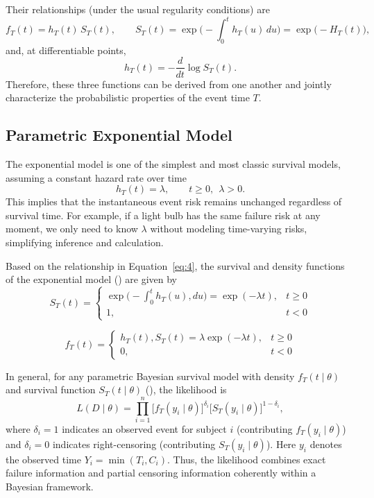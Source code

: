 Their relationships (under the usual regularity conditions) are
\begin{equation}
    f_T(t)=h_T(t)\,S_T(t),\qquad
S_T(t)=\exp\!\Big(-\!\int_0^{t} h_T(u)\,du\Big)=\exp\!\big(-H_T(t)\big),
\label{eq:4}
\end{equation}
and, at differentiable points,
\begin{equation}
    h_T(t)=-\frac{d}{dt}\log S_T(t).
\end{equation}
Therefore, these three functions can be derived from one another and jointly characterize the probabilistic properties of the event time $T$.





\subsection{Parametric Exponential Model} \label{Exponential Model}
The exponential model is one of the simplest and most classic survival models, assuming a constant hazard rate over time
\begin{equation}
h_T(t)=\lambda,\qquad t\ge 0,\ \ \lambda>0 .
\end{equation}
This implies that the instantaneous event risk remains unchanged regardless of survival time. For example, if a light bulb has the same failure risk at any moment, we only need to know $\lambda$ without modeling time-varying risks, simplifying inference and calculation.

Based on the relationship in Equation~\eqref{eq:4}, the survival and density functions of the exponential model (\cite{ibrahim2013bayesian}) are given by
\begin{equation}
S_T(t) =
\begin{cases}
\exp\Big( -\displaystyle\int_0^t h_T(u), du \Big)=\exp(-\lambda t), & t \ge 0 \\
1, & t < 0
\end{cases}
\end{equation}

\begin{equation}
f_T(t) =
\begin{cases}
h_T(t), S_T(t)=\lambda \exp(-\lambda t), & t \ge 0 \\
0, & t < 0
\end{cases}
\end{equation}

In general, for any parametric Bayesian survival model with density $f_T(t\mid\theta)$ and survival function $S_T(t\mid\theta)$ (\cite{ibrahim2013bayesian}), the likelihood is
\begin{equation}
L( D \mid \theta)
= \prod_{i=1}^n
\big[ f_T(y_i \mid \theta) \big]^{\delta_i}
\big[ S_T(y_i \mid \theta) \big]^{1 - \delta_i},
\label{eq:8}
\end{equation}
where $\delta_i=1$ indicates an observed event for subject $i$ (contributing $f_T(y_i\mid\theta)$) and $\delta_i=0$ indicates right-censoring (contributing $S_T(y_i\mid\theta)$). Here $y_i$ denotes the observed time $Y_i=\min(T_i,C_i)$. Thus, the likelihood combines exact failure information and partial censoring information coherently within a Bayesian framework.


